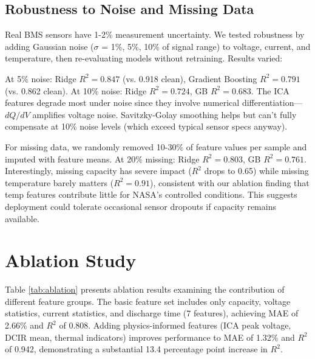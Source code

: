 \documentclass{sn-jnl}
\begin{document}
\subsection{Robustness to Noise and Missing Data}
\label{subsec:robustness}

Real BMS sensors have 1-2\% measurement uncertainty. We tested robustness by adding Gaussian noise ($\sigma$ = 1\%, 5\%, 10\% of signal range) to voltage, current, and temperature, then re-evaluating models without retraining. Results varied:

At 5\% noise: Ridge $R^2 = 0.847$ (vs. 0.918 clean), Gradient Boosting $R^2 = 0.791$ (vs. 0.862 clean). At 10\% noise: Ridge $R^2 = 0.724$, GB $R^2 = 0.683$. The ICA features degrade most under noise since they involve numerical differentiation—$dQ/dV$ amplifies voltage noise. Savitzky-Golay smoothing helps but can't fully compensate at 10\% noise levels (which exceed typical sensor specs anyway).

For missing data, we randomly removed 10-30\% of feature values per sample and imputed with feature means. At 20\% missing: Ridge $R^2 = 0.803$, GB $R^2 = 0.761$. Interestingly, missing capacity has severe impact ($R^2$ drops to 0.65) while missing temperature barely matters ($R^2 = 0.91$), consistent with our ablation finding that temp features contribute little for NASA's controlled conditions. This suggests deployment could tolerate occasional sensor dropouts if capacity remains available.

\section{Ablation Study}
\label{sec:ablation}

Table \ref{tab:ablation} presents ablation results examining the contribution of different feature groups. The basic feature set includes only capacity, voltage statistics, current statistics, and discharge time (7 features), achieving MAE of 2.66\% and $R^2$ of 0.808. Adding physics-informed features (ICA peak voltage, DCIR mean, thermal indicators) improves performance to MAE of 1.32\% and $R^2$ of 0.942, demonstrating a substantial 13.4 percentage point increase in $R^2$.
\end{document}
